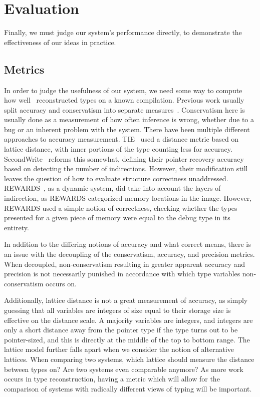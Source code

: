 \section{Evaluation}
\label{sec:eval}
Finally, we must judge our system's performance directly, to demonstrate the effectiveness of our ideas in practice.
\subsection{Metrics}
\label{subsec:metrics}
In order to judge the usefulness of our system, we need some way to compute how well \bitr\ reconstructed types on a known compilation. Previous work usually split accuracy and conservatism into separate measures~\cite{tie,sw}. Conservatism here is usually done as a measurement of how often inference is wrong, whether due to a bug or an inherent problem with the system.
There have been multiple different approaches to accuracy measurement.
TIE~\cite{tie} used a distance metric based on lattice distance, with inner portions of the type counting less for accuracy. SecondWrite~\cite{sw} reforms this somewhat, defining their pointer recovery accuracy based on detecting the number of indirections. However, their modification still leaves the question of how to evaluate structure correctness unaddressed. REWARDS~\cite{rewards}, as a dynamic system, did take into account the layers of indirection, as REWARDS categorized memory locations in the image. However, REWARDS used a simple notion of correctness, checking whether the types presented for a given piece of memory were equal to the debug type in its entirety.

In addition to the differing notions of accuracy and what correct means, there is an issue with the decoupling of the conservatism, accuracy, and precision metrics. When decoupled, non-conservatism resulting in greater apparent accuracy and precision is not necessarily punished in accordance with which type variables non-conservatism occurs on.

Additionally, lattice distance is not a great measurement of accuracy, as simply guessing that all variables are integers of size equal to their storage size is effective on the distance scale. A majority variables are integers, and integers are only a short distance away from the pointer type if the type turns out to be pointer-sized, and this is directly at the middle of the top to bottom range. The lattice model further falls apart when we consider the notion of alternative lattices. When comparing two systems, which lattice should measure the distance between types on? Are two systems even comparable anymore? As more work occurs in type reconstruction, having a metric which will allow for the comparison of systems with radically different views of typing will be important.

